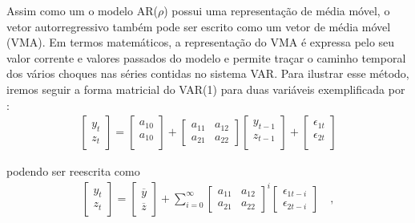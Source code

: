 Assim como um o modelo AR($\rho$) possui uma representação de média móvel, o vetor autorregressivo também pode ser escrito como um vetor de média móvel (VMA). Em termos matemáticos, a representação do VMA é expressa pelo seu valor corrente e valores passados do modelo  e permite traçar o caminho temporal dos vários choques nas séries contidas no sistema VAR. Para ilustrar esse método, iremos seguir a forma matricial do VAR(1) para duas variáveis exemplificada por :
\begin{align} \label{var-mat1}
\begin{bmatrix}
    y_t \\
    z_t
\end{bmatrix}
=
\begin{bmatrix}
    a_{10} \\
    a_{10} \\
\end{bmatrix}
+
\begin{bmatrix}
    a_{11} & a_{12} \\
    a_{21} & a_{22} 
\end{bmatrix}
\begin{bmatrix}
    y_{t-1} \\
    z_{t-1} \\
\end{bmatrix}
+
\begin{bmatrix}
    \epsilon_{1t} \\
    \epsilon_{2t} \\
\end{bmatrix}    
\end{align}

\noindent podendo ser reescrita como
\begin{align} \label{var-mat2}
\begin{bmatrix}
    y_t \\
    z_t
\end{bmatrix}
=
\begin{bmatrix}
    \overline{y} \\
    \overline{z}
\end{bmatrix}
+
\sum_{i=0}^{\infty}
\begin{bmatrix}
    a_{11} & a_{12} \\
    a_{21} & a_{22} 
\end{bmatrix}^i
\begin{bmatrix}
    \epsilon_{1t-i} \\
    \epsilon_{2t-i}
\end{bmatrix} \quad,
\end{align}

